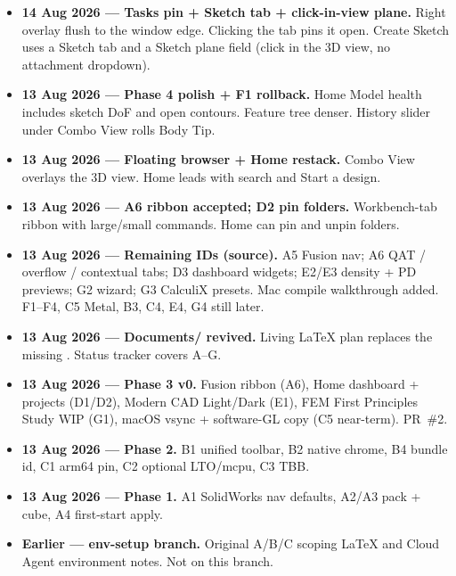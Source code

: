 \documentclass[11pt]{article}
\newcommand{\hairrule}{\vspace{2pt}{\color{hairline}\hrule height 0.6pt}\vspace{2pt}}
\newcommand{\fp}[1]{\texttt{\detokenize{#1}}}
\begin{document}
\begin{itemize}
  \item \textbf{14 Aug 2026 --- Tasks pin + Sketch tab + click-in-view plane.}
        Right overlay flush to the window edge. Clicking the tab pins it open.
        Create Sketch uses a Sketch tab and a Sketch plane field (click in the
        3D view, no attachment dropdown).
  \item \textbf{13 Aug 2026 --- Phase 4 polish + F1 rollback.} Home Model health
        includes sketch DoF and open contours. Feature tree denser. History
        slider under Combo View rolls Body Tip.
  \item \textbf{13 Aug 2026 --- Floating browser + Home restack.} Combo View
        overlays the 3D view. Home leads with search and Start a design.
  \item \textbf{13 Aug 2026 --- A6 ribbon accepted; D2 pin folders.} Workbench-tab
        ribbon with large/small commands. Home can pin and unpin folders.
  \item \textbf{13 Aug 2026 --- Remaining IDs (source).} A5 Fusion nav; A6 QAT /
        overflow / contextual tabs; D3 dashboard widgets; E2/E3 density + PD
        previews; G2 wizard; G3 CalculiX presets. Mac compile walkthrough added.
        F1--F4, C5 Metal, B3, C4, E4, G4 still later.
  \item \textbf{13 Aug 2026 --- Documents/ revived.} Living LaTeX plan replaces the
        missing \fp{docs/macos-native-ui-scope.tex}. Status tracker covers A--G.
  \item \textbf{13 Aug 2026 --- Phase 3 v0.} Fusion ribbon (A6), Home dashboard +
        projects (D1/D2), Modern CAD Light/Dark (E1), FEM First Principles Study
        WIP (G1), macOS vsync + software-GL copy (C5 near-term). PR~\#2.
  \item \textbf{13 Aug 2026 --- Phase 2.} B1 unified toolbar, B2 native chrome,
        B4 bundle id, C1 arm64 pin, C2 optional LTO/mcpu, C3 TBB.
  \item \textbf{13 Aug 2026 --- Phase 1.} A1 SolidWorks nav defaults, A2/A3 pack +
        cube, A4 first-start apply.
  \item \textbf{Earlier --- env-setup branch.} Original A/B/C scoping LaTeX and
        Cloud Agent environment notes. Not on this branch.
\end{itemize}

\vspace{1.2em}
\hairrule
\vspace{0.6em}
\end{document}
